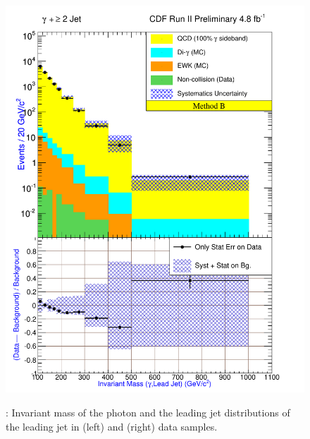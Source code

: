 \documentclass[11pt]{article}
\begin{document}
\begin{figure}[h!]
{ \includegraphics[scale=\resultsHistScale,keepaspectratio=true]{./g30jet_MtdB_plot2_InvMass_pj1.pdf}
}
 \caption{: Invariant mass of the photon and the leading jet distributions of the leading jet in \phoonejet (left) and \photwojet (right) data samples.}
 \label{fig:Result_MtdB_gj1_Mass_gj1}
\end{figure}
\end{document}
